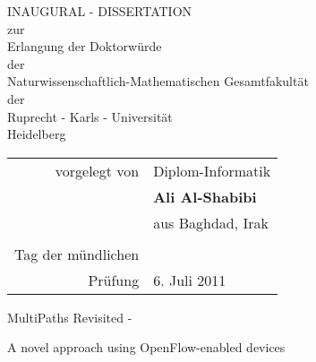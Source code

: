 


\begin{titlepage}

\begin{center}

\huge{}\selectfont  INAUGURAL - DISSERTATION \\
\vspace{0.5cm}
\large zur \\
\large{}\selectfont  Erlangung der Doktorw\"urde \\
\vspace{0.5cm} 
\large{}\selectfont der \\
\large{}\selectfont Naturwissenschaftlich-Mathematischen Gesamtfakult\"at \\
\vspace{0.5cm}
\large{}\selectfont der \\
\large{}\selectfont Ruprecht - Karls - Universit\"at \\
\large{}\selectfont Heidelberg \\


\vfill

\begin{tabular}{r|l}
vorgelegt von  & Diplom-Informatik \\ 
  & \textbf{Ali Al-Shabibi} \\ 
  & aus Baghdad, Irak \\
  & \\
 Tag der m\"undlichen & \\
  Pr\"ufung & 6. Juli 2011
\end{tabular} 

\end{center}

\newpage
\mbox{}

\pagebreak

  \begin{center}

    {\fontsize{32}{34}\selectfont\par\vspace*{0.5cm}MultiPaths Revisited - }
    \par
    {\huge{}\selectfont A novel approach using OpenFlow-enabled devices}
    \par


\end{center}
\end{titlepage}
